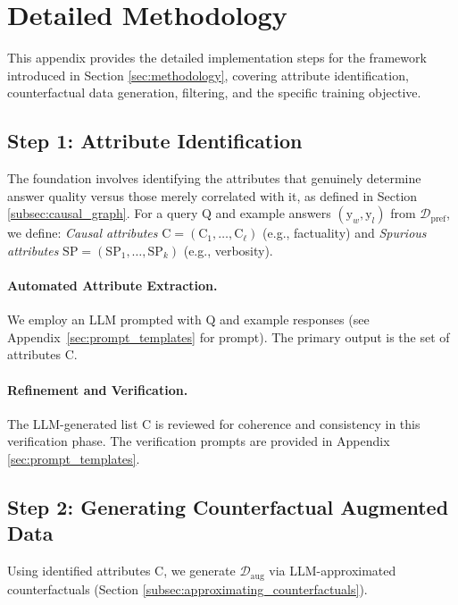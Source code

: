 \section{Detailed \carma{} Methodology}
\label{sec:detailed_methodology}

This appendix provides the detailed implementation steps for the \carma{} framework introduced in Section \ref{sec:methodology}, covering attribute identification, counterfactual data generation, filtering, and the specific training objective.

\subsection{Step 1: Attribute Identification}
\label{subsec:attribute_identification_appendix}

The foundation involves identifying the attributes that genuinely determine answer quality versus those merely correlated with it, as defined in Section \ref{subsec:causal_graph}. For a query $\mathrm{Q}$ and example answers $(\mathrm{y}_w, \mathrm{y}_l)$ from $\mathcal{D}_{\mathrm{pref}}$, we define: \textit{Causal attributes} $\mathrm{C} = (\mathrm{C}_1, \dots, \mathrm{C}_\ell)$ (e.g., factuality) and \textit{Spurious attributes} $\mathrm{SP} = (\mathrm{SP}_1, \dots, \mathrm{SP}_k)$ (e.g., verbosity).

\paragraph{Automated Attribute Extraction.} We employ an LLM prompted with $\mathrm{Q}$ and example responses (see Appendix~\ref{sec:prompt_templates} for prompt). The primary output is the set of attributes $\mathrm{C}$.

\paragraph{Refinement and Verification.} The LLM-generated list $\mathrm{C}$ is reviewed for coherence and consistency in this verification phase. The verification prompts are provided in Appendix \ref{sec:prompt_templates}.

\subsection{Step 2: Generating Counterfactual Augmented Data}
\label{subsec:counterfactual_generation_appendix}

Using identified attributes $\mathrm{C}$, we generate $\mathcal{D}_{\mathrm{aug}}$ via LLM-approximated counterfactuals (Section \ref{subsec:approximating_counterfactuals}).

